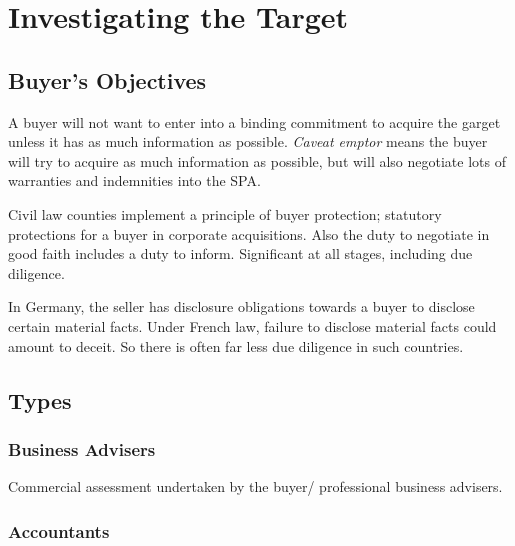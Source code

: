 \documentclass[
]{article}
\begin{document}
\hypertarget{investigating-the-target}{%
\section{Investigating the Target}\label{investigating-the-target}}

\hypertarget{buyers-objectives}{%
\subsection{Buyer's Objectives}\label{buyers-objectives}}

A buyer will not want to enter into a binding commitment to acquire the
garget unless it has as much information as possible. \emph{Caveat
emptor} means the buyer will try to acquire as much information as
possible, but will also negotiate lots of warranties and indemnities
into the SPA.

Civil law counties implement a principle of buyer protection; statutory
protections for a buyer in corporate acquisitions. Also the duty to
negotiate in good faith includes a duty to inform. Significant at all
stages, including due diligence.

In Germany, the seller has disclosure obligations towards a buyer to
disclose certain material facts. Under French law, failure to disclose
material facts could amount to deceit. So there is often far less due
diligence in such countries.

\hypertarget{types}{%
\subsection{Types}\label{types}}

\hypertarget{business-advisers}{%
\subsubsection{Business Advisers}\label{business-advisers}}

Commercial assessment undertaken by the buyer/ professional business
advisers.

\hypertarget{accountants}{%
\subsubsection{Accountants}\label{accountants}}
\end{document}
